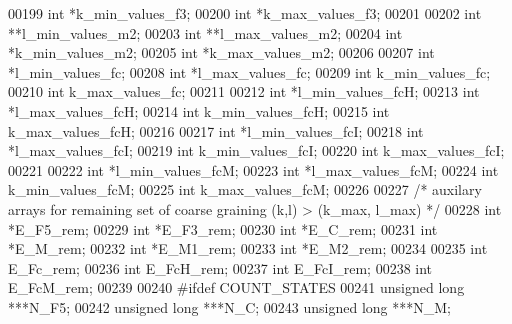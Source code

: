 \begin{DoxyCode}
00199   \textcolor{keywordtype}{int}             *k\_min\_values\_f3;
00200   \textcolor{keywordtype}{int}             *k\_max\_values\_f3;
00201 
00202   \textcolor{keywordtype}{int}             **l\_min\_values\_m2;
00203   \textcolor{keywordtype}{int}             **l\_max\_values\_m2;
00204   \textcolor{keywordtype}{int}             *k\_min\_values\_m2;
00205   \textcolor{keywordtype}{int}             *k\_max\_values\_m2;
00206 
00207   \textcolor{keywordtype}{int}             *l\_min\_values\_fc;
00208   \textcolor{keywordtype}{int}             *l\_max\_values\_fc;
00209   \textcolor{keywordtype}{int}             k\_min\_values\_fc;
00210   \textcolor{keywordtype}{int}             k\_max\_values\_fc;
00211 
00212   \textcolor{keywordtype}{int}             *l\_min\_values\_fcH;
00213   \textcolor{keywordtype}{int}             *l\_max\_values\_fcH;
00214   \textcolor{keywordtype}{int}             k\_min\_values\_fcH;
00215   \textcolor{keywordtype}{int}             k\_max\_values\_fcH;
00216 
00217   \textcolor{keywordtype}{int}             *l\_min\_values\_fcI;
00218   \textcolor{keywordtype}{int}             *l\_max\_values\_fcI;
00219   \textcolor{keywordtype}{int}             k\_min\_values\_fcI;
00220   \textcolor{keywordtype}{int}             k\_max\_values\_fcI;
00221 
00222   \textcolor{keywordtype}{int}             *l\_min\_values\_fcM;
00223   \textcolor{keywordtype}{int}             *l\_max\_values\_fcM;
00224   \textcolor{keywordtype}{int}             k\_min\_values\_fcM;
00225   \textcolor{keywordtype}{int}             k\_max\_values\_fcM;
00226 
00227   \textcolor{comment}{/* auxilary arrays for remaining set of coarse graining (k,l) > (k\_max, l\_max) */}
00228   \textcolor{keywordtype}{int}             *E\_F5\_rem;
00229   \textcolor{keywordtype}{int}             *E\_F3\_rem;
00230   \textcolor{keywordtype}{int}             *E\_C\_rem;
00231   \textcolor{keywordtype}{int}             *E\_M\_rem;
00232   \textcolor{keywordtype}{int}             *E\_M1\_rem;
00233   \textcolor{keywordtype}{int}             *E\_M2\_rem;
00234 
00235   \textcolor{keywordtype}{int}             E\_Fc\_rem;
00236   \textcolor{keywordtype}{int}             E\_FcH\_rem;
00237   \textcolor{keywordtype}{int}             E\_FcI\_rem;
00238   \textcolor{keywordtype}{int}             E\_FcM\_rem;
00239 
00240 \textcolor{preprocessor}{#ifdef COUNT\_STATES}
00241   \textcolor{keywordtype}{unsigned} \textcolor{keywordtype}{long}             ***N\_F5;
00242   \textcolor{keywordtype}{unsigned} \textcolor{keywordtype}{long}             ***N\_C;
00243   \textcolor{keywordtype}{unsigned} \textcolor{keywordtype}{long}             ***N\_M;

\end{DoxyCode}
